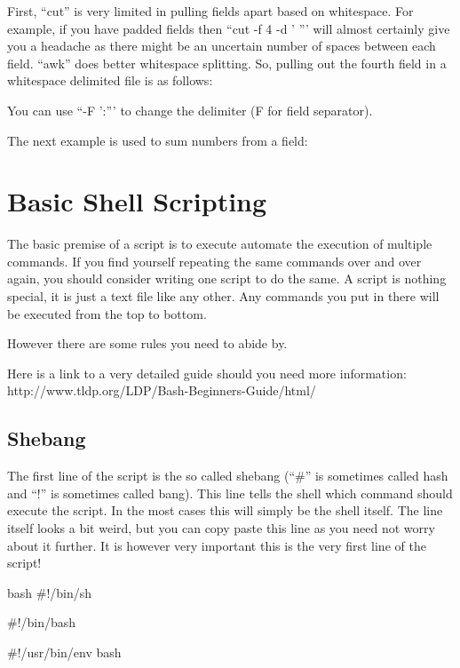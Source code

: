 First, ``cut'' is very limited in pulling fields apart based on whitespace. For
example, if you have padded fields then ``cut -f 4 -d ' ''' will almost
certainly give you a headache as there might be an uncertain number of spaces
between each field. ``awk'' does better whitespace splitting. So, pulling out
the fourth field in a whitespace delimited file is as follows:

\begin{prompt}
\end{prompt}

You can use ``-F ':''' to change the delimiter (F for field separator).

The next example is used to sum numbers from a field:

\begin{prompt}
\end{prompt}

\section{Basic Shell Scripting}

The basic premise of a script is to execute automate the execution of multiple
commands. If you find yourself repeating the same commands over and over again,
you should consider writing one script to do the same.  A script is nothing
special, it is just a text file like any other. Any commands you put in there
will be executed from the top to bottom.

However there are some rules you need to abide by.

Here is a link to a very detailed guide should you need more information:
http://www.tldp.org/LDP/Bash-Beginners-Guide/html/

\subsection{Shebang}
The first line of the script is the so called shebang (``\#'' is sometimes called
hash and ``!'' is sometimes called bang). This line tells the shell which
command should execute the script. In the most cases this will simply be the
shell itself. The line itself looks a bit weird, but you can copy paste this
line as you need not worry about it further. It is however very important this
is the very first line of the script!

\begin{code}{bash}
 #!/bin/sh

 #!/bin/bash

 #!/usr/bin/env bash
\end{code}

